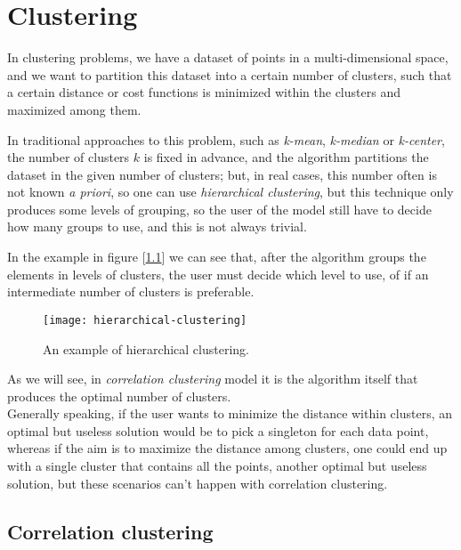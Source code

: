 \chapter{Clustering}\label{sec:clustering}

In clustering problems, we have a dataset of points in a multi-dimensional space, and we want to partition this dataset into a certain number of clusters, such that a certain distance or cost functions is minimized within the clusters and maximized among them.

In traditional approaches to this problem, such as \textit{k-mean}, \textit{k-median} or \textit{k-center}, the number of clusters $k$ is fixed in advance, and the algorithm partitions the dataset in the given number of clusters; but, in real cases, this number often is not known \textit{a priori}, so one can use \textit{hierarchical clustering}, but this technique only produces some levels of grouping, so the user of the model still have to decide how many groups to use, and this is not always trivial.

\begin{ex}
    In the example in figure [\ref{fig:hierarchical-clustering-ex}] we can see that, after the algorithm groups the elements in levels of clusters, the user must decide which level to use, of if an intermediate number of clusters is preferable.
    
    \begin{figure}[h!]
        \centering
        \texttt{[image: hierarchical-clustering]}
        \caption{An example of hierarchical clustering.}
        \label{fig:hierarchical-clustering-ex}
    \end{figure}
\end{ex}

As we will see, in \textit{correlation clustering} model it is the algorithm itself that produces the optimal number of clusters.\\ Generally speaking, if the user wants to minimize the distance within clusters, an optimal but useless solution would be to pick a singleton for each data point, whereas if the aim is to maximize the distance among clusters, one could end up with a single cluster that contains all the points, another optimal but useless solution, but these scenarios can't happen with correlation clustering.


\section{Correlation clustering}\label{sec:corr-clust}

